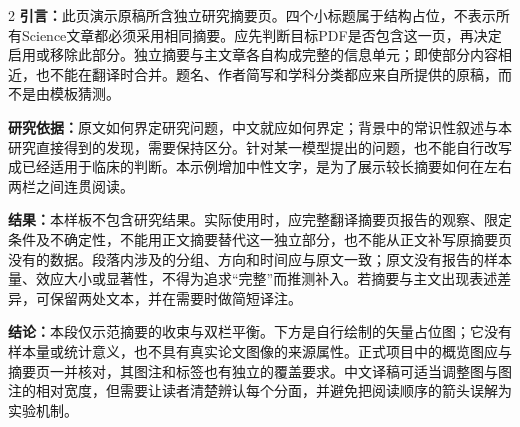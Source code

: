 \documentclass[UTF8,fontset=none,twoside,scheme=plain]{ctexart}
\renewcommand{\normalsize}{\fontsize{9.1bp}{11.9bp}\selectfont}
\begin{document}
\normalsize\thispagestyle{summarypage}
\par\vspace{12bp}
\par\vspace{7bp}
\noindent{\bfseries\fontsize{22bp}{28bp}\selectfont\PaperTitle\par}\vspace{8bp}
\par\vspace{14bp}
\begin{multicols}{2}\setlength{\parindent}{0pt}
\textbf{引言：}此页演示原稿所含独立研究摘要页。四个小标题属于结构占位，不表示所有Science文章都必须采用相同摘要。应先判断目标PDF是否包含这一页，再决定启用或移除此部分。独立摘要与主文章各自构成完整的信息单元；即使部分内容相近，也不能在翻译时合并。题名、作者简写和学科分类都应来自所提供的原稿，而不是由模板猜测。\par\medskip
\textbf{研究依据：}\SampleAbstract 原文如何界定研究问题，中文就应如何界定；背景中的常识性叙述与本研究直接得到的发现，需要保持区分。针对某一模型提出的问题，也不能自行改写成已经适用于临床的判断。本示例增加中性文字，是为了展示较长摘要如何在左右两栏之间连贯阅读。\par\medskip
\textbf{结果：}本样板不包含研究结果。实际使用时，应完整翻译摘要页报告的观察、限定条件及不确定性，不能用正文摘要替代这一独立部分，也不能从正文补写原摘要页没有的数据。段落内涉及的分组、方向和时间应与原文一致；原文没有报告的样本量、效应大小或显著性，不得为追求“完整”而推测补入。若摘要与主文出现表述差异，可保留两处文本，并在需要时做简短译注。\par\medskip
\textbf{结论：}本段仅示范摘要的收束与双栏平衡。下方是自行绘制的矢量占位图；它没有样本量或统计意义，也不具有真实论文图像的来源属性。正式项目中的概览图应与摘要页一并核对，其图注和标签也有独立的覆盖要求。中文译稿可适当调整图与图注的相对宽度，但需要让读者清楚辨认每个分面，并避免把阅读顺序的箭头误解为实验机制。\par
\end{multicols}\vspace{22bp}
\noindent\begin{minipage}[t]{.29\textwidth}\vspace{0pt}\sffamily\fontsize{7.5bp}{10bp}\selectfont\DemoCaption\end{minipage}\hfill
\end{document}
